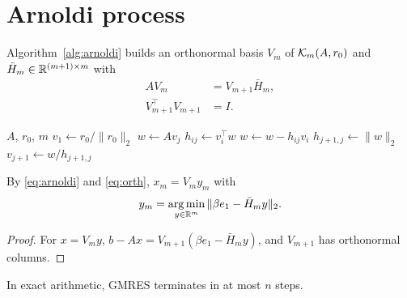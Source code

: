 \section{Arnoldi process}\label{sec:arnoldi}
Algorithm~\ref{alg:arnoldi} builds an orthonormal basis $V_m$ of $\mathcal{K}_{m}(A,r_0)$ and
$\bar H_m\in\mathbb{R}^{(m+1)\times m}$ with
\begin{align}
A V_m &= V_{m+1}\bar H_m, \label{eq:arnoldi}\\
V_{m+1}^\top V_{m+1} &= I. \label{eq:orth}
\end{align}
\begin{algorithm}
\caption{Arnoldi with modified Gram--Schmidt}\label{alg:arnoldi}
\begin{algorithmic}[1]
\Require $A$, $r_0$, $m$
\State $v_1 \gets r_0/\|r_0\|_2$
  \State $w \gets A v_j$
    \State $h_{ij} \gets v_i^\top w$ 
    \State $w \gets w - h_{ij} v_i$
  \EndFor
  \State $h_{j+1,j} \gets \|w\|_2$
    \State \Return {}
  \EndIf
  \State $v_{j+1} \gets w / h_{j+1,j}$
\EndFor
\end{algorithmic}
\end{algorithm}
\begin{theorem}\label{thm:ls}
By \eqref{eq:arnoldi} and \eqref{eq:orth}, $x_m=V_m y_m$ with
\[ y_m=\operatorname*{arg\,min}_{y\in\mathbb{R}^m}\|\beta e_1-\bar H_m y\|_2 . \]
\end{theorem}
\begin{proof}
For $x=V_m y$, $b-Ax=V_{m+1}(\beta e_1-\bar H_m y)$, and $V_{m+1}$ has orthonormal columns.
\end{proof}
\begin{lemma}\label{lem:term}
In exact arithmetic, GMRES terminates in at most $n$ steps.
\end{lemma}
